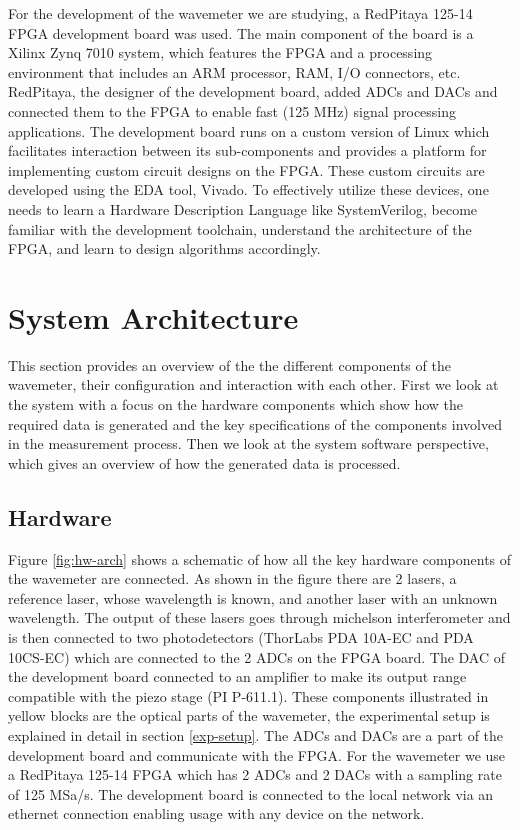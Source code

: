 \documentclass[12pt, twoside]{report}
\begin{document}
\vspace{1em}
For the development of the wavemeter we are studying, a RedPitaya 125-14 FPGA development board was used. The main component of the board is a Xilinx Zynq 7010 system, which features the FPGA and a processing environment that includes an ARM processor, RAM, I/O connectors, etc. RedPitaya, the designer of the development board, added ADCs and DACs and connected them to the FPGA to enable fast (125 MHz) signal processing applications. The development board runs on a custom version of Linux which facilitates interaction between its sub-components and provides a platform for implementing custom circuit designs on the FPGA. These custom circuits are developed using the EDA tool, Vivado. To effectively utilize these devices, one needs to learn a Hardware Description Language like SystemVerilog, become familiar with the development toolchain, understand the architecture of the FPGA, and learn to design algorithms accordingly.

\vspace{1em}

\pagebreak
\section{System Architecture}

This section provides an overview of the the different components of the wavemeter, their configuration and interaction with each other. First we look at the system with a focus on the hardware components which show how the required data is generated and the key specifications of the components involved in the measurement process. Then we look at the system software perspective, which gives an overview of how the generated data is processed.

\subsection{Hardware}

Figure \ref{fig:hw-arch} shows a schematic of how all the key hardware components of the wavemeter are connected. As shown in the figure there are 2 lasers, a reference laser, whose wavelength is known, and another laser with an unknown wavelength. The output of these lasers goes through michelson interferometer and is then connected to two photodetectors (ThorLabs PDA 10A-EC and PDA 10CS-EC) which are connected to the 2 ADCs on the FPGA board. The DAC of the development board connected to an amplifier to make its output range compatible with the piezo stage (PI P-611.1). These components illustrated in yellow blocks are the optical parts of the wavemeter, the experimental setup is explained in detail in section \ref{exp-setup}. The ADCs and DACs are a part of the development board and communicate with the FPGA. For the wavemeter we use a RedPitaya 125-14 FPGA which has 2 ADCs and 2 DACs with a sampling rate of 125 MSa/s. The development board is connected to the local network via an ethernet connection enabling usage with any device on the network. 
\end{document}
